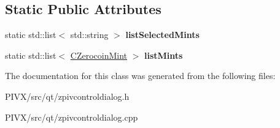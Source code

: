 \subsection*{Static Public Attributes}
\begin{DoxyCompactItemize}
\item 
\mbox{\label{class_z_piv_control_dialog_a5423d598f1c4998a9d7c9019fc22494b}} 
static std\+::list$<$ std\+::string $>$ {\bfseries list\+Selected\+Mints}
\item 
\mbox{\label{class_z_piv_control_dialog_a8256fadd4ef8164361cc0129701c05f7}} 
static std\+::list$<$ \mbox{\hyperlink{class_c_zerocoin_mint}{C\+Zerocoin\+Mint}} $>$ {\bfseries list\+Mints}
\end{DoxyCompactItemize}


The documentation for this class was generated from the following files\+:\begin{DoxyCompactItemize}
\item 
P\+I\+V\+X/src/qt/zpivcontroldialog.\+h\item 
P\+I\+V\+X/src/qt/zpivcontroldialog.\+cpp\end{DoxyCompactItemize}
